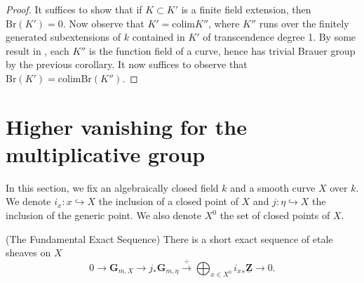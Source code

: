 \begin{proof}
It suffices to show that if $K \subset K'$ is a finite field extension, then
$\text{Br}(K') = 0$. Now observe that $K' = \text{colim} K''$, where $K''$ runs
over the finitely generated subextensions of $k$ contained in $K'$ of
transcendence degree 1. By some result in \cite{H}, each $K''$ is the function
field of a curve, hence has trivial Brauer group by the previous corollary. It
now suffices to observe that $\text{Br}(K') = \text{colim} \text{Br}(K'')$.
\end{proof}






\section{Higher vanishing for the multiplicative group}
\label{section-higher-Gm}

\noindent
In this section, we fix an algebraically closed field $k$ and a smooth curve
$X$ over $k$. We denote $i_x : x \hookrightarrow X$ the inclusion of a closed
point of $X$ and $j : \eta \hookrightarrow X$ the inclusion of the generic
point. We also denote $X^0$ the set of closed points of $X$.

\begin{theorem}
\label{theorem-fundamental-exact-sequence}
(The Fundamental Exact Sequence)
There is a short exact sequence of etale sheaves on $X$
$$
0 \longrightarrow \mathbf{G}_{m,X} \longrightarrow j_* \mathbf{G}_{m,\eta}
\xrightarrow{\ \div\ } \bigoplus_{x \in X^0} {i_x}_* \underline{\mathbf{Z}}
\longrightarrow 0.
$$
\end{theorem}

